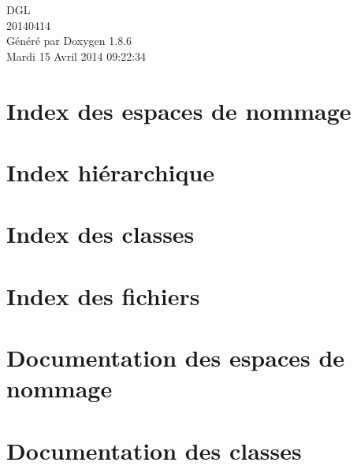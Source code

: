 \documentclass[twoside]{book}
\newcommand{\clearemptydoublepage}{%
  \newpage{\pagestyle{empty}\cleardoublepage}%
}
\begin{document}
\hypersetup{pageanchor=false}
\begin{titlepage}
\vspace*{7cm}
\begin{center}%
{\Large D\-G\-L \\[1ex]\large 20140414 }\\
\vspace*{1cm}
{\large Généré par Doxygen 1.8.6}\\
\vspace*{0.5cm}
{\small Mardi 15 Avril 2014 09:22:34}\\
\end{center}
\end{titlepage}
\clearemptydoublepage
\tableofcontents
\clearemptydoublepage
{}
\hypersetup{pageanchor=true}

\chapter{Index des espaces de nommage}

\chapter{Index hiérarchique}

\chapter{Index des classes}

\chapter{Index des fichiers}

\chapter{Documentation des espaces de nommage}

\chapter{Documentation des classes}


























\end{document}
